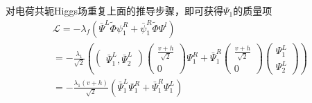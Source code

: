 对电荷共轭Higgs场重复上面的推导步骤，即可获得$\Psi_1$的质量项
\begin{gather*}
\mathscr{L}=-\lambda_f(\bar{\Psi}^L\tilde{\Phi}\psi_1^R+\bar{\psi}^R_1\tilde{\Phi}\Psi^l)\nonumber\\
=-\frac{\lambda_1}{\sqrt{2}}\left(\begin{pmatrix}\bar{\Psi}_1^L,\bar{\Psi}_2^L\end{pmatrix}\begin{pmatrix}\frac{v+h}{\sqrt{2}}\\0\end{pmatrix}\Psi_1^R+\bar{\Psi}_1^R\begin{pmatrix}\frac{v+h}{\sqrt{2}} \\ 0\end{pmatrix}\begin{pmatrix}\Psi^L_1 \\ \Psi^L_2\end{pmatrix}\right)\\
=-\frac{\lambda_1(v+h)}{\sqrt{2}}\left(\bar{\Psi}_1^L\Psi_1^R+\bar{\Psi}_1^R\Psi_1^L  \right)
\end{gather*}


